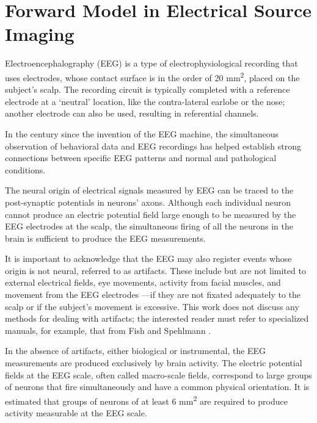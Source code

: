\chapter{Forward Model in Electrical Source Imaging}
\label{ch:forward}





Electroencephalography (EEG) is a type of electrophysiological recording that uses electrodes, whose contact surface is in the order of 20 \si{mm^2}, placed on the subject's scalp.
%
The recording circuit is typically completed with a reference electrode at a `neutral' location, like the contra-lateral earlobe or the nose; another electrode can also be used, resulting in referential channels. 
%

In the century since the invention of the EEG machine, the simultaneous observation of behavioral data and EEG recordings has helped establish strong connections between specific EEG patterns and normal and pathological conditions.

The neural origin of electrical signals measured by EEG can be traced to the post-synaptic potentials in neurons' axons.
%
Although each individual neuron cannot produce an electric potential field large enough to be measured by the EEG electrodes at the scalp, the simultaneous firing of all the neurons in the brain is sufficient to produce the EEG measurements.

It is important to acknowledge that the EEG may also register events whose origin is not neural, referred to as artifacts. These include but are not limited to external electrical fields, eye movements, activity from facial muscles, and movement from the EEG electrodes —if they are not fixated adequately to the scalp or if the subject's movement is excessive.
%
This work does not discuss any methods for dealing with artifacts; the interested reader must refer to specialized manuals, for example, that from Fish and Spehlmann \cite{fisch1999fisch}.

In the absence of artifacts, either biological or instrumental, the EEG measurements are produced exclusively by brain activity.
%
The electric potential fields at the EEG scale, often called macro-scale fields, correspond to large groups of neurons that fire simultaneously and have a common physical orientation.
%
It is estimated that groups of neurons of at least 6 \si{mm^2} are required to produce activity measurable at the EEG scale.

